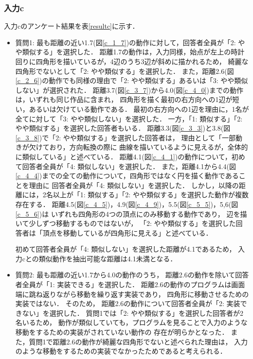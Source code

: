 \documentclass[11pt]{jreport}
\begin{document}
\subsubsection{入力c}
入力cのアンケート結果を表\ref{resultc}に示す．

\begin{itemize}
    \item 質問1: 最も距離の近い1.7(図\ref{c_1_7})の動作に対して，回答者全員が「2: やや類似する」を選択した．
    距離1.7の動作は，入力同様，始点が左上の時計回りに四角形を描いているが，4辺のうち3辺が斜めに描かれるため，
    綺麗な四角形でないとして「2: やや類似する」を選択した．
    また，距離2.6(図\ref{c_2_6})の動作でも同様の理由で「2: やや類似する」あるいは「3: やや類似しない」が選択された．
    距離3.7(図\ref{c_3_7})から4.0(図\ref{c_4_0})までの動作は，いずれも同じ作品に含まれ，
    四角形を描く最初の右方向への1辺が短い，あるいは欠けている動作である．
    最初の右方向への1辺を理由に，1名が全てに対して「3: やや類似しない」を選択した．
    一方，「1: 類似する」「2: やや類似する」を選択した回答者もいる．
    距離3.3(図\ref{c_3_3})と3.8(図\ref{c_3_8})で「2: やや類似する」を選択した回答者は，
    理由として「一部動きが欠けており，方向転換の際に
    曲線を描いているように見えるが，全体的に類似している」と述べている．
    距離4.1(図\ref{c_4_1})の動作について，初めて回答者全員が「4: 類似しない」を選択した．
    また，距離4.1から4.4(図\ref{c_4_4})までの全ての動作について，四角形ではなく円を描く動作であることを理由に
    回答者全員が「4: 類似しない」を選択した．
    しかし，以降の距離には，2名以上が「1: 類似する」「2: やや類似する」を選択した動作が複数存在する．
    距離4.5(図\ref{c_4_5})，4.9(図\ref{c_4_9})，5.5(図\ref{c_5_5})，5,6(図\ref{c_5_6})は
    いずれも四角形の4つの頂点にのみ移動する動作であり，
    辺を描いて少しずつ移動するものではないが，
    「2: やや類似する」を選択した回答者は「頂点を移動しているが四角形に見える」と述べている．
    
    初めて回答者全員が「4: 類似しない」を選択した距離が4.1であるため，
    入力cとの類似動作を抽出可能な距離は4.1未満となる．
    
    \item 質問2: 最も距離の近い1.7から4.0の動作のうち，
    距離2.6の動作を除いて回答者全員が「1: 実装できる」を選択した．
    距離2.6の動作のプログラムは画面端に跳ね返りながら移動を繰り返す実装であり，
    四角形に移動させるための実装ではない．
    そのため， 距離2.6の動作について回答者全員が「2: 実装できない」を選択した．
    質問1では「2: やや類似する」を選択した回答者が2名いるため，
    動作が類似していても，プログラムを見ることで入力のような移動をするための実装がされていない動作の
    存在が明らかとなった．
    また，質問1で距離2.6の動作が綺麗な四角形でないと述べられた理由は，
    入力のような移動をするための実装でなかったためであると考えられる．
\end{itemize}
\end{document}
